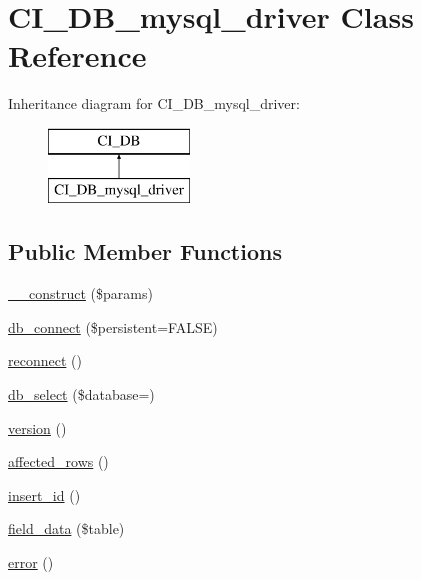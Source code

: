 \hypertarget{class_c_i___d_b__mysql__driver}{}\section{C\+I\+\_\+\+D\+B\+\_\+mysql\+\_\+driver Class Reference}
\label{class_c_i___d_b__mysql__driver}
Inheritance diagram for C\+I\+\_\+\+D\+B\+\_\+mysql\+\_\+driver\+:\begin{figure}[H]
\begin{center}
\leavevmode
\includegraphics[height=2.000000cm]{class_c_i___d_b__mysql__driver}
\end{center}
\end{figure}
\subsection*{Public Member Functions}
\begin{DoxyCompactItemize}
\item 
\mbox{\hyperlink{class_c_i___d_b__mysql__driver_a9162320adff1a1a4afd7f2372f753a3e}{\+\_\+\+\_\+construct}} (\$params)
\item 
\mbox{\hyperlink{class_c_i___d_b__mysql__driver_a52bf595e79e96cc0a7c907a9b45aeb4d}{db\+\_\+connect}} (\$persistent=F\+A\+L\+SE)
\item 
\mbox{\hyperlink{class_c_i___d_b__mysql__driver_a57c19c642ab3023e28d10c50f86ff0a8}{reconnect}} ()
\item 
\mbox{\hyperlink{class_c_i___d_b__mysql__driver_a18ae9c21870b30b45337c5e3626190cc}{db\+\_\+select}} (\$database=\textquotesingle{}\textquotesingle{})
\item 
\mbox{\hyperlink{class_c_i___d_b__mysql__driver_a6080dae0886626b9a4cedb29240708b1}{version}} ()
\item 
\mbox{\hyperlink{class_c_i___d_b__mysql__driver_a77248aaad33eb132c04cc4aa3f4bc8cb}{affected\+\_\+rows}} ()
\item 
\mbox{\hyperlink{class_c_i___d_b__mysql__driver_a933f2cde8dc7f87875e257d0a4902e99}{insert\+\_\+id}} ()
\item 
\mbox{\hyperlink{class_c_i___d_b__mysql__driver_a90355121e1ed009e0efdbd544ab56efa}{field\+\_\+data}} (\$table)
\item 
\mbox{\hyperlink{class_c_i___d_b__mysql__driver_a43b8d30b879d4f09ceb059b02af2bc02}{error}} ()
\end{DoxyCompactItemize}
